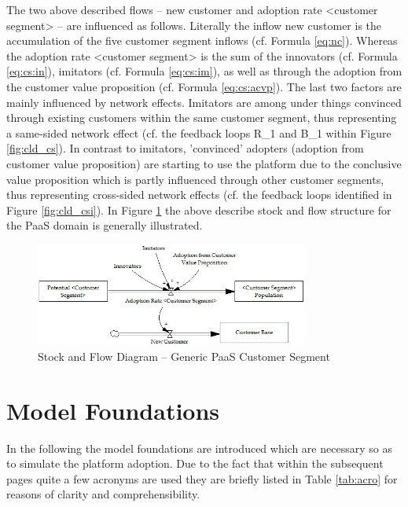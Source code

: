 The two above described flows -- new customer and adoption rate <customer segment>  -- are influenced as follows. Literally the inflow new customer is the accumulation of the five customer segment inflows (cf. Formula \ref{eq:nc}). Whereas the adoption rate <customer segment> is the sum of the innovators (cf. Formula \ref{eq:cs:in}), imitators (cf. Formula \ref{eq:cs:im}), as well as through the adoption from the customer value proposition (cf. Formula \ref{eq:cs:acvp}). The last two factors are mainly influenced by network effects. Imitators are among under things convinced through existing customers within the same customer segment, thus representing a same-sided network effect (cf. the feedback loops R\_1 and B\_1 within Figure \ref{fig:cld_cs}). In contrast to imitators, 'convinced' adopters (adoption from customer value proposition) are starting to use the platform due to the conclusive value proposition which is partly influenced through other customer segments, thus representing cross-sided network effects (cf. the feedback loops identified in Figure \ref{fig:cld_csi}). In Figure \ref{fig:sfd_cs} the above describe stock and flow structure for the \ac{PaaS} domain is generally illustrated.

\begin{figure}[tb]
	\centering
	\includegraphics[width=0.8\textwidth]{gfx/sfd_customerSegment}
	\caption{Stock and Flow Diagram -- Generic PaaS Customer Segment}
	\label{fig:sfd_cs}
\end{figure}

\section{Model Foundations}\label{ch:sfd:mf}
In the following the model foundations are introduced which are necessary so as to simulate the platform adoption. Due to the fact that within the subsequent pages quite a few acronyms are used they are briefly listed in Table \ref{tab:acro} for reasons of clarity and comprehensibility.

